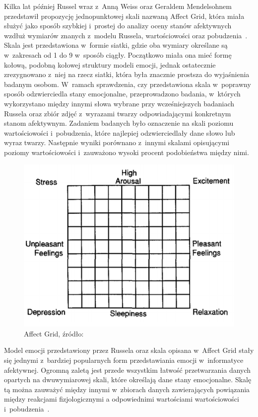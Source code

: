 Kilka lat później Russel wraz z~Anną Weiss oraz Geraldem Mendelsohnem przedstawił propozycję jednopunktowej skali nazwaną Affect Grid, która miała służyć jako sposób szybkiej i~prostej do analizy oceny stanów afektywnych wzdłuż wymiarów znanych z~modelu Russela, wartościowości oraz pobudzenia~\cite{affect_grid_russel_1989}. Skala jest przedstawiona w~formie siatki, gdzie oba wymiary określane są w~zakresach od 1 do 9 w~sposób ciągły. Początkowo miała ona mieć formę kołową, podobną kołowej struktury modeli emocji, jednak ostatecznie zrezygnowano z~niej na rzecz siatki, która była znacznie prostsza do wyjaśnienia badanym osobom. W~ramach sprawdzenia, czy przedstawiona skala w~poprawny sposób odzwierciedla stany emocjonalne, przeprowadzono badania, w~których wykorzystano między innymi słowa wybrane przy wcześniejszych badaniach Russela oraz zbiór zdjęć z~wyrazami twarzy odpowiadającymi konkretnym stanom afektywnym. Zadaniem badanych było oznaczenie na skali poziomu wartościowości i~pobudzenia, które najlepiej odzwierciedlały dane słowo lub wyraz twarzy. Następnie wyniki porównano z~innymi skalami opisującymi poziomy wartościowości i~zauważono wysoki procent podobieństwa między nimi. 

\begin{figure}[h]
	\centering
	\includegraphics[width=0.5\linewidth]{images/affect_grid.png}
	\caption{Affect Grid, źródło:~\cite{affect_grid_russel_1989}}
	\label{fig:affect_grid}
\end{figure}

Model emocji przedstawiony przez Russela oraz skala opisana w~Affect Grid stały się jednymi z~bardziej popularnych form przedstawiania emocji w~informatyce afektywnej. Ogromną zaletą jest przede wszystkim łatwość przetwarzania danych opartych na dwuwymiarowej skali, które określają dane stany emocjonalne. Skalę tą można zauważyć między innymi w~zbiorach danych zawierających powiązania między reakcjami fizjologicznymi a odpowiednimi wartościami wartościowości i~pobudzenia~\cite{deap_dataset_2011,amigos_dataset_2017}. 

